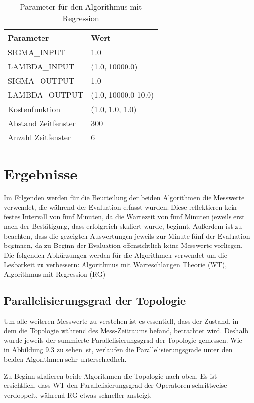 \begin{table}
\caption{Parameter für den Algorithmus mit Regression} 
\centering
\begin{tabular}{ll}
\hline
\textbf{Parameter} & \textbf{Wert} \\ \hline
SIGMA\_INPUT & 1.0 \\
LAMBDA\_INPUT & (1.0, 10000.0) \\
SIGMA\_OUTPUT & 1.0 \\
LAMBDA\_OUTPUT & (1.0, 10000.0 10.0) \\
Kostenfunktion & (1.0, 1.0, 1.0) \\
Abstand Zeitfenster & 300 \\
Anzahl Zeitfenster & 6 \\
\hline
\end{tabular}
\end{table}

\section{Ergebnisse}

Im Folgenden werden für die Beurteilung der beiden Algorithmen die Messwerte verwendet, die während der Evaluation erfasst wurden.
Diese reflektieren kein festes Intervall von fünf Minuten, da die Wartezeit von fünf Minuten jeweils erst nach der Bestätigung, dass erfolgreich skaliert wurde, beginnt.
Außerdem ist zu beachten, dass die gezeigten Auswertungen jeweils zur Minute fünf der Evaluation beginnen, da zu Beginn der Evaluation offensichtlich keine Messwerte vorliegen.
Die folgenden Abkürzungen werden für die Algorithmen verwendet um die Lesbarkeit zu verbessern:
Algorithmus mit Warteschlangen Theorie (WT), Algorithmus mit Regression (RG).

\subsection{Parallelisierungsgrad der Topologie}
Um alle weiteren Messwerte zu verstehen ist es essentiell, dass der Zustand, in dem die Topologie während des Mess-Zeitraums befand, betrachtet wird.
Deshalb wurde jeweils der summierte Parallelisierungsgrad der Topologie gemessen.
Wie in Abbildung 9.3 zu sehen ist, verlaufen die Parallelisierungsgrade unter den beiden Algorithmen sehr unterschiedlich.

Zu Beginn skalieren beide Algorithmen die Topologie nach oben. Es ist ersichtlich, dass WT den Parallelisierungsgrad der Operatoren schrittweise verdoppelt, während RG etwas schneller ansteigt.

